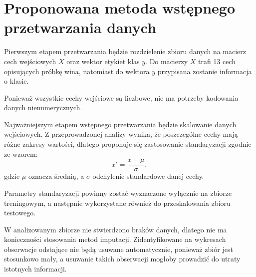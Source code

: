 \section{Proponowana metoda wstępnego przetwarzania danych}

Pierwszym etapem przetwarzania będzie rozdzielenie zbioru danych na macierz cech wejściowych $X$ oraz wektor etykiet klas $y$. Do macierzy $X$ trafi 13 cech opisujących próbkę wina, natomiast do wektora $y$ przypisana zostanie informacja o klasie.

Ponieważ wszystkie cechy wejściowe są liczbowe, nie ma potrzeby kodowania danych nienumerycznych.

Najważniejszym etapem wstępnego przetwarzania będzie skalowanie danych wejściowych. Z przeprowadzonej analizy wynika, że poszczególne cechy mają różne zakresy wartości, dlatego proponuje się zastosowanie standaryzacji zgodnie ze wzorem:
\[
x' = \frac{x - \mu}{\sigma},
\]
gdzie $\mu$ oznacza średnią, a $\sigma$ odchylenie standardowe danej cechy.

Parametry standaryzacji powinny zostać wyznaczone wyłącznie na zbiorze treningowym, a następnie wykorzystane również do przeskalowania zbioru testowego.

W analizowanym zbiorze nie stwierdzono braków danych, dlatego nie ma konieczności stosowania metod imputacji. Zidentyfikowane na wykresach obserwacje odstające nie będą usuwane automatycznie, ponieważ zbiór jest stosunkowo mały, a usuwanie takich obserwacji mogłoby prowadzić do utraty istotnych informacji.
